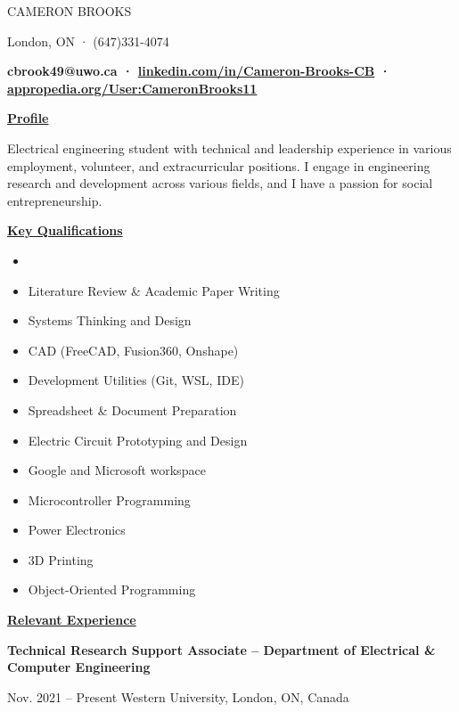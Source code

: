 \documentclass[
]{article}
\author{}
\date{}
\begin{document}
CAMERON BROOKS

London, ON · (647)331-4074

\textbf{cbrook49@uwo.ca ·
      \href{https://www.linkedin.com/in/Cameron-Brooks-CB/}{linkedin.com/in/Cameron-Brooks-CB}
      ·
      \href{https://www.appropedia.org/User:CameronBrooks11}{appropedia.org/User:CameronBrooks11}}

\textbf{\uline{Profile}}

Electrical engineering student with technical and leadership experience
in various employment, volunteer, and extracurricular positions. I
engage in engineering research and development across various fields,
and I have a passion for social entrepreneurship.

\textbf{\uline{Key Qualifications}}

\begin{itemize}
      \item
      \item
            Literature Review \& Academic Paper Writing
      \item
            Systems Thinking and Design
      \item
            CAD (FreeCAD, Fusion360, Onshape)
      \item
            Development Utilities (Git, WSL, IDE)
      \item
            Spreadsheet \& Document Preparation
      \item
            Electric Circuit Prototyping and Design
      \item
            Google and Microsoft workspace
      \item
            Microcontroller Programming
      \item
            Power Electronics
      \item
            3D Printing
      \item
            Object-Oriented Programming
\end{itemize}

\textbf{\uline{Relevant Experience}}

\textbf{Technical Research Support Associate -- Department of Electrical
      \& Computer Engineering}

Nov. 2021 -- Present \textbar{} Western University, London, ON, Canada
\end{document}
